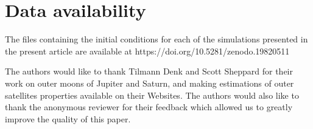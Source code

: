 \documentclass{aa}
\begin{document}
\section*{Data availability}
The files containing the initial conditions for each of the simulations presented in the present article are available at https://doi.org/10.5281/zenodo.19820511


\begin{acknowledgements}
      The authors would like to thank Tilmann Denk and Scott Sheppard for their work on outer moons of Jupiter and Saturn, and making estimations of outer satellites properties available on their Websites. The authors would also like to thank the anonymous reviewer for their feedback which allowed us to greatly improve the quality of this paper.
\end{acknowledgements}
\end{document}
